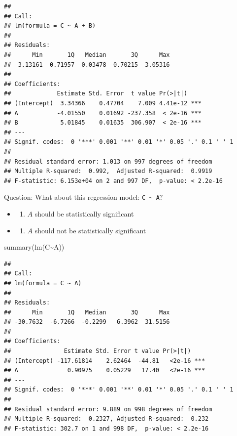 \documentclass[
]{article}
\newenvironment{Shaded}{\begin{snugshade}}{\end{snugshade}}
\newcommand{\FunctionTok}[1]{\textcolor[rgb]{0.00,0.00,0.00}{#1}}
\newcommand{\NormalTok}[1]{#1}
\newcommand{\SpecialCharTok}[1]{\textcolor[rgb]{0.00,0.00,0.00}{#1}}
\providecommand{\tightlist}{%
  \setlength{\itemsep}{0pt}\setlength{\parskip}{0pt}}
\begin{document}
\begin{verbatim}
## 
## Call:
## lm(formula = C ~ A + B)
## 
## Residuals:
##      Min       1Q   Median       3Q      Max 
## -3.13161 -0.71957  0.03478  0.70215  3.05316 
## 
## Coefficients:
##             Estimate Std. Error  t value Pr(>|t|)    
## (Intercept)  3.34366    0.47704    7.009 4.41e-12 ***
## A           -4.01550    0.01692 -237.358  < 2e-16 ***
## B            5.01845    0.01635  306.907  < 2e-16 ***
## ---
## Signif. codes:  0 '***' 0.001 '**' 0.01 '*' 0.05 '.' 0.1 ' ' 1
## 
## Residual standard error: 1.013 on 997 degrees of freedom
## Multiple R-squared:  0.992,  Adjusted R-squared:  0.9919 
## F-statistic: 6.153e+04 on 2 and 997 DF,  p-value: < 2.2e-16
\end{verbatim}

Question: What about this regression model:
\texttt{C\ \textasciitilde{}\ A}?

\begin{itemize}
\item
  \begin{enumerate}
  \def\labelenumi{\alph{enumi})}
  \tightlist
  \item
    \(A\) should be statistically significant
  \end{enumerate}
\item
  \begin{enumerate}
  \def\labelenumi{\alph{enumi})}
  \setcounter{enumi}{1}
  \tightlist
  \item
    \(A\) should not be statistically significant
  \end{enumerate}
\end{itemize}

\begin{Shaded}
\begin{Highlighting}[]
\FunctionTok{summary}\NormalTok{(}\FunctionTok{lm}\NormalTok{(C}\SpecialCharTok{\textasciitilde{}}\NormalTok{A))}
\end{Highlighting}
\end{Shaded}

\begin{verbatim}
## 
## Call:
## lm(formula = C ~ A)
## 
## Residuals:
##      Min       1Q   Median       3Q      Max 
## -30.7632  -6.7266  -0.2299   6.3962  31.5156 
## 
## Coefficients:
##               Estimate Std. Error t value Pr(>|t|)    
## (Intercept) -117.61814    2.62464  -44.81   <2e-16 ***
## A              0.90975    0.05229   17.40   <2e-16 ***
## ---
## Signif. codes:  0 '***' 0.001 '**' 0.01 '*' 0.05 '.' 0.1 ' ' 1
## 
## Residual standard error: 9.889 on 998 degrees of freedom
## Multiple R-squared:  0.2327, Adjusted R-squared:  0.232 
## F-statistic: 302.7 on 1 and 998 DF,  p-value: < 2.2e-16
\end{verbatim}
\end{document}

